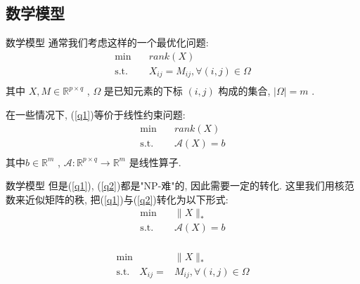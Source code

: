 \documentclass[slidestop, compress, mathserif, UTF8]{beamer}
\numberwithin{equation}{section}                                        %
\begin{document}
		\subsection{数学模型}
			\begin{frame}[t]{数学模型}
				通常我们考虑这样的一个最优化问题:
				\begin{equation}
					\begin{split}\label{q1}
						\min \quad
							& rank(X)\\
						\text{s.t.} \quad
							& X_{ij}=M_{ij},\forall(i,j)\in\Omega\\
					\end{split}
				\end{equation}
				\small 其中 $X, M\in\mathbb{R}^{p\times q}$ , $\Omega$ 是已知元素的下标 $(i, j)$ 构成的集合, $\lvert{\Omega}\rvert = m$ .\normalsize

				在一些情况下, (\ref{q1})等价于线性约束问题:
				\begin{equation}
					\begin{split}\label{q2}
						\min \quad
							& rank(X)\\
						\text{s.t.} \quad
							& \mathcal{A}(X)=b\\
					\end{split}
				\end{equation}
				\small{其中$b \in \mathbb{R}^{m}$ , $\mathcal{A}: \mathbb{R}^{p \times q} \rightarrow \mathbb{R}^{m}$ 是线性算子.}\normalsize
			\end{frame}
			\begin{frame}[t]{数学模型}
				但是(\ref{q1}), (\ref{q2})都是"NP-难"的, 因此需要一定的转化. 这里我们用核范数来近似矩阵的秩, 把(\ref{q1})与(\ref{q2})转化为以下形式:
				\begin{equation}
					\begin{split}\label{q3}
						\min \quad
							& \lVert{X}\rVert_*\\
						\text{s.t.} \quad
							& \mathcal{A}(X) = b\\	
					\end{split}
				\end{equation}
				
				\begin{equation}
					\begin{split}\label{q4}
						\min \quad
							& \lVert{X}\rVert_*\\
						\text{s.t.} \quad
							X_{ij} = &M_{ij}, \forall(i,j)\in\Omega\\
					\end{split}
				\end{equation}
			\end{frame}
\end{document}
